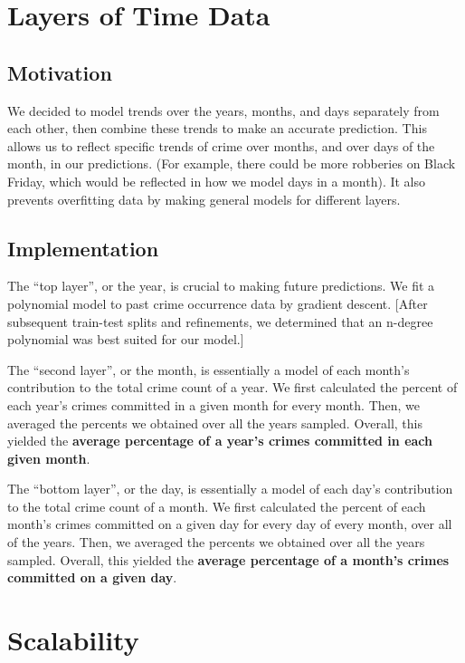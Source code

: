 \documentclass{article}
\begin{document}
\section{Layers of Time Data}

\subsection{Motivation}

We decided to model trends over the years, months, and days separately from each other, then combine these trends to make an accurate prediction. This allows us to reflect specific trends of crime over months, and over days of the month, in our predictions. (For example, there could be more robberies on Black Friday, which would be reflected in how we model days in a month). It also prevents overfitting data by making general models for different layers.

\subsection{Implementation}

The ``top layer'', or the year, is crucial to making future predictions. We fit a polynomial model to past crime occurrence data by gradient descent. [After subsequent train-test splits and refinements, we determined that an n-degree polynomial was best suited for our model.] \bigskip 

The ``second layer'', or the month, is essentially a model of each month's contribution to the total crime count of a year. We first calculated the percent of each year's crimes committed in a given month for every month. Then, we averaged the percents we obtained over all the years sampled. Overall, this yielded the \textbf{average percentage of a year's crimes committed in each given month}. \bigskip 

The ``bottom layer'', or the day, is essentially a model of each day's contribution to the total crime count of a month. We first calculated the percent of each month's crimes committed on a given day for every day of every month, over all of the years. Then, we averaged the percents we obtained over all the years sampled. Overall, this yielded the \textbf{average percentage of a month's crimes committed on a given day}. \bigskip 

\section{Scalability}
\end{document}
